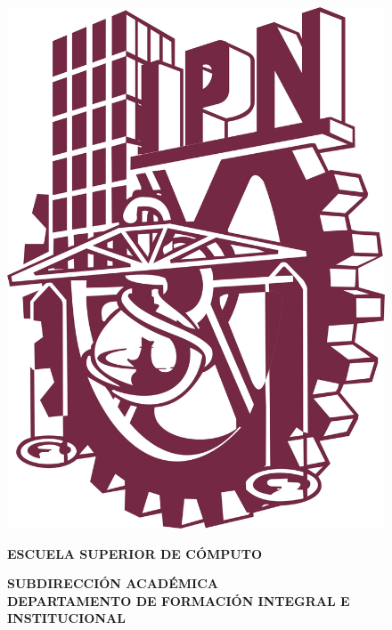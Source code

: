 \documentclass[12pt]{report}
\begin{document}
\begin{figure}[H]
	\begin{minipage}[p]{0.13\linewidth}
		\centering
		\includegraphics[width=\linewidth]{images/logoIPN}
	\end{minipage}
	\hspace{.85cm}
	\begin{minipage}[p] {0.55\linewidth}
		\begin{center}
			\begin{large}
				\textbf {ESCUELA SUPERIOR DE CÓMPUTO}\\
			\end{large}
			\begin{normalsize}
				\textbf {SUBDIRECCIÓN ACADÉMICA}\\
				\vspace*{0.1in}
				\textbf {DEPARTAMENTO DE FORMACIÓN INTEGRAL E INSTITUCIONAL}\\

\end{normalsize}
\end{center}
\end{minipage}
\end{figure}
\end{document}
